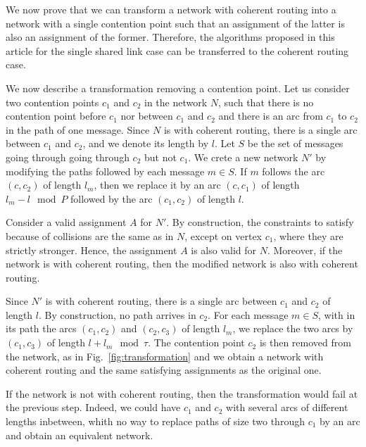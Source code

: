 \documentclass[pdflatex,sn-mathphys,iicol]{sn-jnl}%
\theoremstyle{thmstyleone}%
\theoremstyle{thmstyletwo}%
\theoremstyle{thmstylethree}%
\begin{document}
We now prove that we can transform a network with coherent routing into a network with a single contention point such that an assignment of the latter is also an assignment of the former. Therefore, the algorithms proposed in this article for the single shared link case can be transferred to the coherent routing case. 

We now describe a transformation removing a contention point. Let us consider two contention points $c_1$ and $c_2$ in the network $N$, such that there is no contention point before $c_1$ nor between $c_1$ and $c_2$ and there is an arc from $c_1$ to $c_2$ in the path of one message. Since $N$ is with coherent routing, there is a single arc between $c_1$ and $c_2$, and we denote its length by $l$. 
Let $S$ be the set of messages going through going through $c_2$ but not $c_1$. We crete a new network $N'$ by modifying the paths followed by each message $m \in S$. If $m$ follows the arc $(c,c_2)$ of length $l_m$, then we replace it by an arc $(c,c_1)$ of length $l_m - l \mod P$ followed by the arc $(c_1,c_2)$ of length $l$.

Consider a valid assignment $A$ for $N'$. By construction, the constraints to satisfy because of collisions are the same as in $N$, except on vertex $c_1$, where they are strictly stronger. Hence, the assignment $A$ is also valid for $N$. Moreover, if the network is with coherent routing, then the modified network is also with coherent routing.    

Since $N'$ is with coherent routing, there is a single arc between $c_1$ and $c_2$ of length $l$. By construction, no path arrives in $c_2$. For each message $m \in S$, with in its path the arcs $(c_1,c_2)$ and $(c_2,c_3)$ of length $l_m$, we replace the two arcs by $(c_1,c_3)$ of length $ l + l_m \mod \tau$. 
 The contention point $c_2$ is then removed from the network, as in Fig.~\ref{fig:transformation} and we obtain a network with coherent routing and the same satisfying assignments as the original one.

If the network is not with coherent routing, then the transformation would fail at the previous step. Indeed, we could have $c_1$ and $c_2$ with several
arcs of different lengths inbetween, whith no way to replace paths of size two
through $c_1$ by an arc and obtain an equivalent network. 
\end{document}
